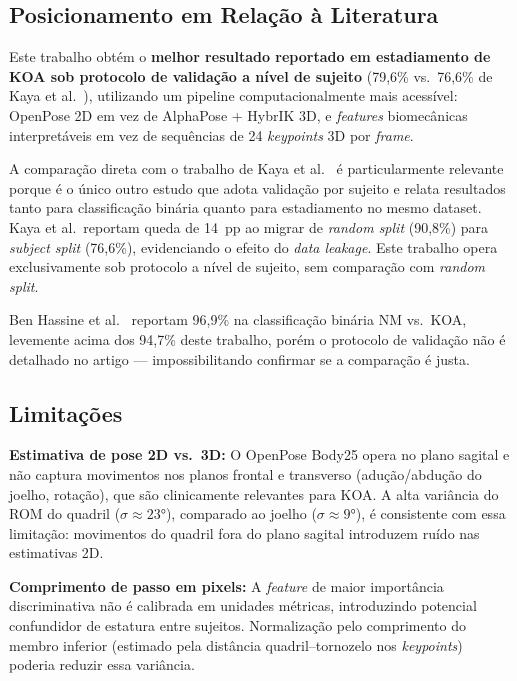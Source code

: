 \documentclass[a4paper,12pt]{article}
\begin{document}
\subsection{Posicionamento em Relação à Literatura}

Este trabalho obtém o \textbf{melhor resultado reportado em estadiamento de KOA sob
protocolo de validação a nível de sujeito} (79,6\% vs.\ 76,6\% de Kaya et
al.~\cite{Kaya2025}), utilizando um pipeline computacionalmente mais acessível:
OpenPose 2D em vez de AlphaPose + HybrIK 3D, e \textit{features} biomecânicas
interpretáveis em vez de sequências de 24 \textit{keypoints} 3D por \textit{frame}.

A comparação direta com o trabalho de Kaya et al.~\cite{Kaya2025} é particularmente
relevante porque é o único outro estudo que adota validação por sujeito e relata
resultados tanto para classificação binária quanto para estadiamento no mesmo dataset.
Kaya et al.\ reportam queda de 14~pp ao migrar de \textit{random split} (90,8\%) para
\textit{subject split} (76,6\%), evidenciando o efeito do \textit{data leakage}.
Este trabalho opera exclusivamente sob protocolo a nível de sujeito, sem comparação
com \textit{random split}.

Ben Hassine et al.~\cite{BenHassine2024} reportam 96,9\% na classificação binária
NM vs.\ KOA, levemente acima dos 94,7\% deste trabalho, porém o protocolo de
validação não é detalhado no artigo --- impossibilitando confirmar se a comparação é
justa.

\subsection{Limitações}

\textbf{Estimativa de pose 2D vs.\ 3D:} O OpenPose Body25 opera no plano sagital e
não captura movimentos nos planos frontal e transverso (adução/abdução do joelho,
rotação), que são clinicamente relevantes para KOA. A alta variância do ROM do
quadril ($\sigma \approx 23°$), comparado ao joelho ($\sigma \approx 9°$), é
consistente com essa limitação: movimentos do quadril fora do plano sagital
introduzem ruído nas estimativas 2D.

\textbf{Comprimento de passo em pixels:} A \textit{feature} de maior importância
discriminativa não é calibrada em unidades métricas, introduzindo potencial
confundidor de estatura entre sujeitos. Normalização pelo comprimento do membro
inferior (estimado pela distância quadril--tornozelo nos \textit{keypoints}) poderia
reduzir essa variância.
\end{document}
